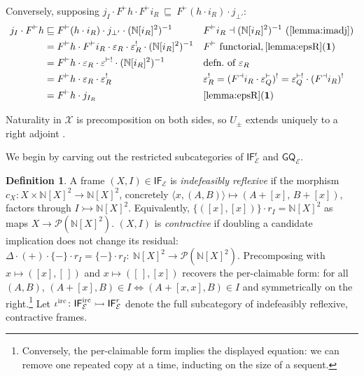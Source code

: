 \documentclass{article}
\theoremstyle{definition}
\newtheorem{definition}{Definition}[section]
\newcommand{\N}{\mathbb{N}}
\newcommand{\cE}{\mathcal{E}}
\newcommand{\cP}{\mathcal{P}}
\newcommand{\cX}{\mathcal{X}}
\newcommand{\cat}[1]{\mathsf{#1}}
\begin{document}
{Conversely, supposing $j_I\cdot F^\vdash h\cdot F^\vdash i_R\ \sqsubseteq\ F^\vdash(h\cdot i_R)\cdot j_{\bot'}$:
\begin{align*}
    j_I\cdot F^\vdash h
    &\sqsubseteq F^\vdash(h\cdot i_R)\cdot j_{\bot'}\cdot(\N[i_R]^2)^{-1}
        && F^\vdash i_R\dashv(\N[i_R]^2)^{-1}\ \text{(\cref{lemma:imadj})}\\
    &= F^\vdash h\cdot F^\vdash i_R \cdot \varepsilon_R\cdot \varepsilon^!_R \cdot (\N[i_R]^2)^{-1}
        && F^\vdash\text{ functorial}, \text{\cref{lemma:epsR}({\bf 1})}\\
    &= F^\vdash h\cdot\varepsilon_R\cdot\varepsilon^{\vdash!}\cdot(\N[i_R]^2)^{-1}
        && \text{defn.\ of }\varepsilon_R\\
    &= F^\vdash h\cdot\varepsilon_R\cdot\varepsilon_R^!
        && \varepsilon_R^!=(F^\dashv i_R\cdot \varepsilon^\vdash_Q)^!=\varepsilon^{\vdash!}_Q\cdot(F^\dashv i_R)^! \\
    &= F^\vdash h\cdot j_{I_R}
        && \text{\cref{lemma:epsR}({\bf 1})}
\end{align*}

Naturality in $\cX$ is precomposition on both sides, so $U_\pm$ extends uniquely to a
right adjoint \cite[IV.1, Thm~2]{mclane}.
}


We begin by carving out the restricted subcategories of $\cat{IF^r_\cE}$ and
$\cat{GQ_\cE}$.

\begin{definition}\label{def:indefrefl}
A frame $(X,I)\in\cat{IF}_\cE$ is {\it indefeasibly reflexive} if the morphism $c_X\colon X\times\N[X]^2\to\N[X]^2$, concretely $\langle x,(A,B)\rangle\mapsto(A+[x],\,B+[x])$, factors through $I\rightarrowtail\N[X]^2$.
Equivalently, $\{([x],[x])\}\cdot r_I=\N[X]^2$ as maps $X\to\cP(\N[X]^2)$. $(X,I)$ is {\it contractive} if doubling a candidate implication does not change its residual: $\Delta\cdot(+)\cdot\{-\}\cdot r_I = \{-\}\cdot r_I \colon\ \N[X]^2\to\cP(\N[X]^2)$.
Precomposing with $x\mapsto([x],[\,])$ and $x\mapsto([\,],[x])$ recovers the per-claimable form: for all $(A,B)$, $(A+[x],B)\in I\iff(A+[x,x],B)\in I$ and symmetrically on the right.\footnote{Conversely, the per-claimable form implies the displayed equation: we can remove one repeated copy at a time, inducting on the size of a sequent.}
Let $\iota^{\rm irc}\colon\cat{IF}^{\rm irc}_\cE\rightarrowtail\cat{IF}^{r}_\cE$ denote the full subcategory of indefeasibly reflexive, contractive frames.
\end{definition}
\end{document}
